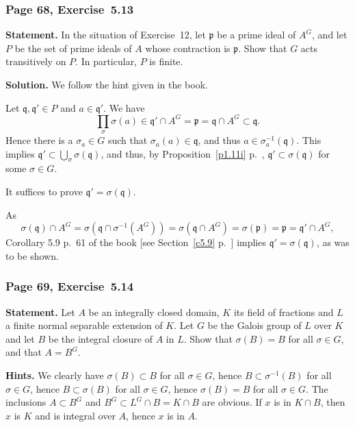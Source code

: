 \documentclass[12pt,letterpaper]{article}%
\newcommand{\mf}{\mathfrak}
\newcommand{\ppp}{\mf p}
\newcommand{\qqq}{\mf q}
\newcommand{\nn}{\noindent}
\begin{document}
\subsubsection{Page 68, Exercise~5.13}%

\textbf{Statement.} In the situation of Exercise~12, let $\ppp$ be a prime ideal of $A^G$, and let $P$ be the set of prime ideals of $A$ whose contraction is $\ppp$. Show that $G$ acts transitively on $P$. In particular, $P$ is finite.

\nn[Let $\ppp_1,\ppp_2\in P$ and let $x\in\ppp_1$. Then $\prod_\sigma\sigma(x)\in\ppp_1\cap A^G=\ppp\subset\ppp_2$, hence $\sigma(x)\in\ppp_2$ for some $\sigma\in G$. Deduce that $\ppp_1$ is contained in $\bigcup_\sigma\sigma(\ppp_2)$, and then apply (1.11) and (5.9).]

\nn\textbf{Solution.} We follow the hint given in the book.

Let $\qqq,\qqq'\in P$ and $a\in\qqq'$. We have  
$$
\prod_\sigma\sigma(a)\in\qqq'\cap A^G=\ppp=\qqq\cap A^G\subset\qqq.
$$ 
Hence there is a $\sigma_a\in G$ such that $\sigma_a(a)\in\qqq$, and thus $a\in\sigma_a^{-1}(\qqq)$. This implies $\qqq'\subset\bigcup_\sigma\sigma(\qqq)$, and thus, by Proposition~\ref{p1.11i} p.~\pageref{p1.11i}, $\qqq'\subset\sigma(\qqq)$ for some $\sigma\in G$. 

It suffices to prove $\qqq'=\sigma(\qqq)$.

As 
$$
\sigma(\qqq)\cap A^G=\sigma\left(\qqq\cap\sigma^{-1}(A^G)\right)=\sigma\left(\qqq\cap A^G\right)=\sigma(\ppp)=\ppp=\qqq'\cap A^G,
$$ 
Corollary 5.9 p.~61 of the book [see Section~\ref{c5.9} p.~\pageref{c5.9}] implies $\qqq'=\sigma(\qqq)$, as was to be shown.

\subsubsection{Page 69, Exercise~5.14}%

\textbf{Statement.} Let $A$ be an integrally closed domain, $K$ its field of fractions and $L$ a finite normal separable extension of $K$. Let $G$ be the Galois group of $L$ over $K$ and let $B$ be the integral closure of $A$ in $L$. Show that $\sigma(B)=B$ for all $\sigma\in G$, and that $A=B^G$.

\nn\textbf{Hints.} We clearly have $\sigma(B)\subset B$ for all $\sigma\in G$, hence $B\subset\sigma^{-1}(B)$ for all $\sigma\in G$, hence $B\subset\sigma(B)$ for all $\sigma\in G$, hence $\sigma(B)=B$ for all $\sigma\in G$. The inclusions $A\subset B^G$ and $B^G\subset L^G\cap B=K\cap B$ are obvious. If $x$ is in $K\cap B$, then $x$ is $K$ and is integral over $A$, hence $x$ is in $A$.
\end{document}
